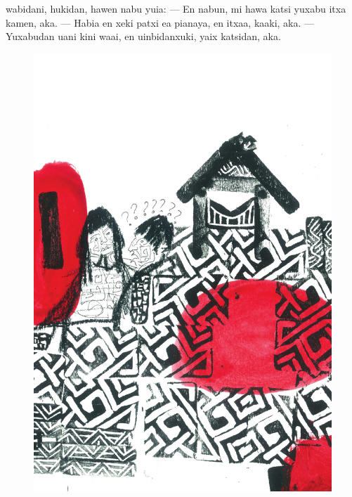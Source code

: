\vspace{2em}

 wabidani, hukidan,
hawen nabu yuia:\break
--- En nabun, mi hawa
katsi yuxabu
itxa kamen, aka.\break
--- Habia en xeki patxi
ea pianaya,
en itxaa, kaaki, aka.\break
--- Yuxabudan uani kini
waai, en uinbidanxuki,
yaix katsidan, aka.

\vspace*{\fill}

\pagebreak
\thispagestyle{empty}
\begin{figure}
\vspace*{-.5cm}
\hspace*{-2.2cm}\includegraphics[width=138mm]{./imgs/img9.pdf}
\end{figure}

\chapter*{}

